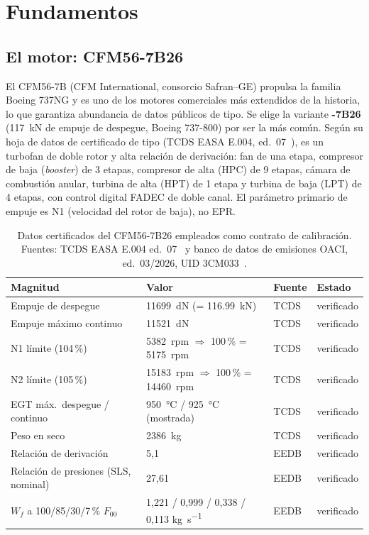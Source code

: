 \chapter{Fundamentos}
\label{cap:fundamentos}

\section{El motor: CFM56-7B26}
\label{sec:motor}

El CFM56-7B (CFM International, consorcio Safran--GE) propulsa la familia Boeing 737NG y es uno
de los motores comerciales más extendidos de la historia, lo que garantiza abundancia de datos
públicos de tipo. Se elige la variante \textbf{-7B26} (\SI{117}{\kilo\newton} de empuje de
despegue, Boeing 737-800) por ser la más común. Según su hoja de datos de certificado de tipo
(TCDS EASA E.004, ed.~07~\cite{EASA2023}), es un turbofan de doble rotor y alta relación de
derivación: fan de una etapa, compresor de baja (\emph{booster}) de 3 etapas, compresor de alta
(HPC) de 9 etapas, cámara de combustión anular, turbina de alta (HPT) de 1 etapa y turbina de
baja (LPT) de 4 etapas, con control digital FADEC de doble canal. El parámetro primario de
empuje es N1 (velocidad del rotor de baja), no EPR.

\begin{table}[htbp]
  \centering\small
  \caption{Datos certificados del CFM56-7B26 empleados como contrato de calibración. Fuentes:
  TCDS EASA E.004 ed.~07~\cite{EASA2023} y banco de datos de emisiones OACI, ed.~03/2026, UID
  3CM033~\cite{ICAO2026}.}
  \label{tab:tcds}
  \begin{tabular}{llll}
    \toprule
    Magnitud & Valor & Fuente & Estado \\
    \midrule
    Empuje de despegue & \SI{11699}{\deca\newton} (= \SI{116.99}{\kilo\newton}) & TCDS & verificado \\
    Empuje máximo continuo & \SI{11521}{\deca\newton} & TCDS & verificado \\
    N1 límite (104\,\%) & \SI{5382}{rpm} $\Rightarrow$ 100\,\% = \SI{5175}{rpm} & TCDS & verificado \\
    N2 límite (105\,\%) & \SI{15183}{rpm} $\Rightarrow$ 100\,\% = \SI{14460}{rpm} & TCDS & verificado \\
    EGT máx.\ despegue / continuo & \SI{950}{\degreeCelsius} / \SI{925}{\degreeCelsius} (mostrada) & TCDS & verificado \\
    Peso en seco & \SI{2386}{\kilo\gram} & TCDS & verificado \\
    Relación de derivación & 5{,}1 & EEDB & verificado \\
    Relación de presiones (SLS, nominal) & 27{,}61 & EEDB & verificado \\
    $W_f$ a 100/85/30/7\,\% $F_{00}$ & 1{,}221 / 0{,}999 / 0{,}338 / 0{,}113 \si{\kilo\gram\per\second} & EEDB & verificado \\
    \bottomrule
  \end{tabular}
\end{table}

